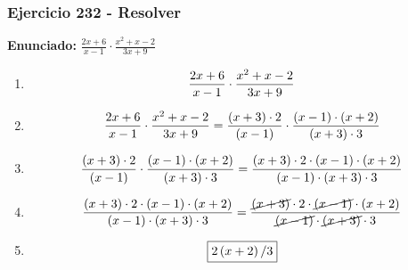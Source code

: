 \documentclass[11pt,a4paper]{article}
\newcommand{\fitmath}[1]{%
\[
\setbox0=\hbox{$\displaystyle #1$}%
\ifdim\wd0>\linewidth
\resizebox{\linewidth}{!}{$\displaystyle #1$}%
\else
#1%
\fi
\]
}
\begin{document}
\subsubsection*{Ejercicio 232 - Resolver}
\textbf{Enunciado:} $ \frac{2 x + 6}{x - 1} \cdot \frac{x^{2} + x - 2}{3 x + 9} $\par
\begin{enumerate}[leftmargin=2em]
\item \fitmath{\frac{2 x + 6}{x - 1} \cdot \frac{x^{2} + x - 2}{3 x + 9}}
\item \fitmath{\frac{2 x + 6}{x - 1} \cdot \frac{x^{2} + x - 2}{3 x + 9}= \frac{\left(x + 3\right)\cdot 2}{\left(x - 1\right)} \cdot \frac{\left(x - 1\right)\cdot \left(x + 2\right)}{\left(x + 3\right)\cdot 3}}
\item \fitmath{\frac{\left(x + 3\right)\cdot 2}{\left(x - 1\right)}\cdot \frac{\left(x - 1\right)\cdot \left(x + 2\right)}{\left(x + 3\right)\cdot 3}= \frac{\left(x + 3\right)\cdot 2\cdot \left(x - 1\right)\cdot \left(x + 2\right)}{\left(x - 1\right)\cdot \left(x + 3\right)\cdot 3}}
\item \fitmath{\frac{\left(x + 3\right)\cdot 2\cdot \left(x - 1\right)\cdot \left(x + 2\right)}{\left(x - 1\right)\cdot \left(x + 3\right)\cdot 3}= \frac{\cancel{\left(x + 3\right)}\cdot 2\cdot \cancel{\left(x - 1\right)}\cdot \left(x + 2\right)}{\cancel{\left(x - 1\right)}\cdot \cancel{\left(x + 3\right)}\cdot 3}}
\item \fitmath{\boxed{2 \left(x + 2\right) / 3}}
\end{enumerate}

\vspace{0.12cm}
\end{document}
